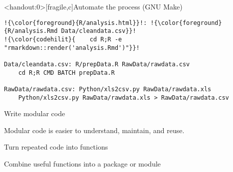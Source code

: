 \documentclass[aspectratio=169,12pt,t]{beamer}
\begin{document}
\begin{frame}<handout:0>[fragile,c]{Automate the process (GNU Make)}

\addtocounter{framenumber}{-1}

\begin{center}
\begin{minipage}[c]{13.8cm}
\begin{semiverbatim}
\lstset{basicstyle=\footnotesize}
\begin{lstlisting}[escapechar=!,linewidth=13.8cm]
!{\color{foreground}{R/analysis.html}}!: !{\color{foreground}{R/analysis.Rmd Data/cleandata.csv}}!
!{\color{codehilit}{    cd R;R -e "rmarkdown::render('analysis.Rmd')"}}!

Data/cleandata.csv: R/prepData.R RawData/rawdata.csv
    cd R;R CMD BATCH prepData.R

RawData/rawdata.csv: Python/xls2csv.py RawData/rawdata.xls
    Python/xls2csv.py RawData/rawdata.xls > RawData/rawdata.csv
\end{lstlisting}
\end{semiverbatim}
\end{minipage}
\end{center}
\end{frame}





\begin{frame}[c]{Write modular code}

  \bbi
  \item Modular code is easier to understand, maintain, and reuse.
  \item Turn repeated code into functions
  \item Combine useful functions into a package or module
  \ei


\end{frame}
\end{document}
